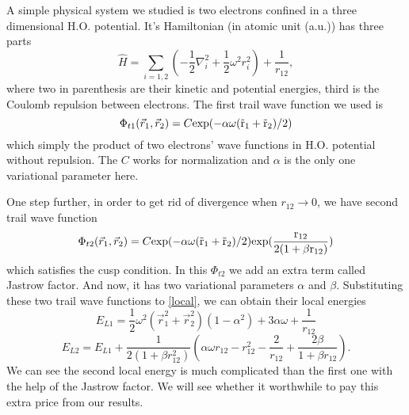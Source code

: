 A simple physical system we studied is two electrons confined in a three dimensional H.O. potential. 
It's Hamiltonian (in atomic unit (a.u.)) has three parts
\begin{equation}
	\hat{H}=\sum_{i=1,2}(-\frac{1}{2}\nabla_i^2+\frac{1}{2}\omega^2r_i^2)+\frac{1}{r_{12}},
\end{equation}
where two in parenthesis are their kinetic and potential energies, third is the Coulomb repulsion between electrons. 
The first trail wave function we used is 
\begin{equation}\label{eq:t1}
	\Phi_{t1}(\vec{r}_1,\vec{r}_2)=C\rm{exp}(-\alpha \omega (\vec{r}_1+\vec{r}_2)/2)
\end{equation}
which simply the product of two electrons' wave functions in H.O. potential without repulsion.
The $C$ works for normalization and $\alpha$ is the only one variational parameter here.

One step further, in order to get rid of divergence when $r_{12}\rightarrow 0$, we have second trail wave function
\begin{equation}\label{eq:t2}
	\Phi_{t2}(\vec{r}_1,\vec{r}_2)=C\rm{exp}(-\alpha \omega (\vec{r}_1+\vec{r}_2)/2)\rm{exp}(\frac{r_{12}}{2(1+\beta r_{12})})
\end{equation}
which satisfies the cusp condition.
In this $\Phi_{t2}$ we add an extra term called Jastrow factor.
And now, it has two variational parameters $\alpha$ and $\beta$.
Substituting these two trail wave functions to \ref{local}, we can obtain their local energies
\begin{equation}
	E_{L1}= \frac{1}{2}\omega^2(\vec{r}_1^2+\vec{r}_2^2)(1-\alpha ^2)+3 \alpha \omega + \frac{1}{r_{12}}
\end{equation}
\begin{equation}
	E_{L2}= E_{L1}+\frac{1}{2(1+\beta r_{12}^2)}\left( \alpha \omega r_{12}-r_{12}^2-\frac{2}{r_{12}}+\frac{2\beta}{1+\beta r_{12}}\right).
\end{equation}
We can see the second local energy is much complicated than the first one with the help of the Jastrow factor. 
We will see whether it worthwhile to pay this extra price from our results.
